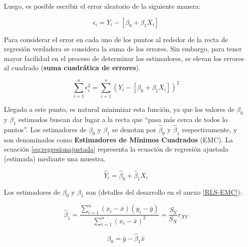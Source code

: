 \documentclass[
  11pt,
]{book}
\theoremstyle{definition}
\theoremstyle{definition}
\theoremstyle{definition}
\theoremstyle{definition}
\theoremstyle{remark}
\begin{document}
Luego, es posible escribir el error aleatorio de la siguiente manera:

\begin{equation}
\epsilon_i = Y_i - [\beta_0 + \beta_1X_i]
\label{eq:funcion-errores}
\end{equation}

Para considerar el error en cada uno de los puntos al rededor de la recta de regresión verdadera se considera la suma de los errores. Sin embargo, para tener mayor facilidad en el proceso de determinar los estimadores, se elevan los errores al cuadrado (\textbf{suma cuadrática de errores}).

\begin{equation}
\sum_{i=1}^n\epsilon_i^2 = \sum_{i=1}^n (Y_i - [\beta_0 + \beta_1X_i])^2
\label{eq:sumacuadratica-RL}
\end{equation}

Llegado a este punto, es natural minimizar esta función, ya que los valores de \(\beta_0\) y \(\beta_1\) estimados buscan dar lugar a la recta que ``pasa más cerca de todos lo puntos''. Los estimadores de \(\beta_0\) y \(\beta_1\) se denotan por \(\widehat{\beta}_0\) y \(\widehat{\beta}_1\) respectivamente, y son denominados como \textbf{Estimadores de Mínimos Cuadrados} (EMC). La ecuación \eqref{eq:regresionajustada} representa la ecuación de regresión ajustada (estimada) mediante una muestra.

\begin{equation}
\widehat{Y}_i = \widehat{\beta}_0 + \widehat{\beta}_1X_i
\label{eq:regresionajustada}
\end{equation}

Los estimadores de \(\beta_0\) y \(\beta_1\) son (detalles del desarrollo en el anexo \ref{RLS-EMC}):

\begin{equation}
\widehat{\beta}_1 = \frac{\displaystyle\sum_{i=1}^n(x_i-\bar{x})(y_i-\bar{y})}{\displaystyle\sum_{i=1}^n(x_i-\bar{x})^2} = \frac{S_Y}{S_X}r_{XY}
\label{eq:beta1gorro}
\end{equation}

\begin{equation}
\widehat{\beta}_0 = \bar{y} - \widehat{\beta}_1\bar{x}
\label{eq:beta0gorro}
\end{equation}
\end{document}
